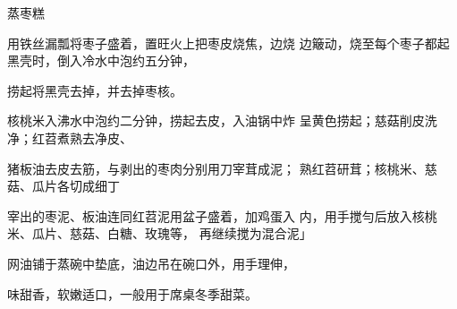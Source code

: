 \begin{recipe}{蒸枣糕}

\ingredients


\cooking

\step 用铁丝漏瓢将枣子盛着，置旺火上把枣皮烧焦，边烧 边簸动，烧至每个枣子都起黑壳时，倒入冷水中泡约五分钟，

捞起将黑壳去掉，并去掉枣核。

\step 核桃米入沸水中泡约二分钟，捞起去皮，入油锅中炸 呈黄色捞起；慈菇削皮洗净；红苕煮熟去净皮、

猪板油去皮去筋，与剥出的枣肉分别用刀宰茸成泥； 熟红苕研茸；核桃米、慈菇、瓜片各切成细丁

\step 	宰出的枣泥、板油连同红苕泥用盆子盛着，加鸡蛋入 内，用手搅勻后放入核桃米、瓜片、慈菇、白糖、玫瑰等， 再继续搅为混合泥」

\step 	网油铺于蒸碗中垫底，油边吊在碗口外，用手理伸，

\notes

味甜香，软嫩适口，一般用于席桌冬季甜菜。

\end{recipe}

